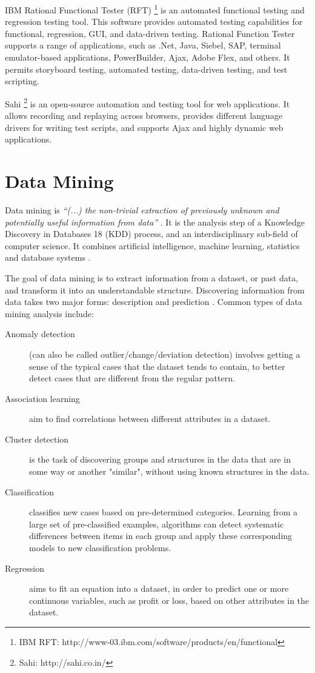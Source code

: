 IBM Rational Functional Tester (RFT) \footnote{IBM RFT: http://www-03.ibm.com/software/products/en/functional} is an automated functional testing and regression testing tool. This software provides automated testing capabilities for functional, regression, GUI, and data-driven testing. Rational Function Tester supports a range of applications, such as .Net, Java, Siebel, SAP, terminal emulator-based applications, PowerBuilder, Ajax, Adobe Flex, and others. It permits storyboard testing, automated testing, data-driven testing, and test scripting.

Sahi \footnote{Sahi: http://sahi.co.in/} is an open-source automation and testing tool for web applications. It allows recording and replaying across browsers, provides different language drivers for writing test scripts, and supports Ajax and highly dynamic web applications. 

\section{Data Mining}\label{sec:datamining}

Data mining is \textit{“(...) the non-trivial extraction of previously unknown and potentially useful information from data”} \cite{fayyad1996data}. It is the analysis step of a Knowledge Discovery in Databases 18 (KDD) process, and an interdisciplinary sub-field of computer science. It combines artificial intelligence, machine learning, statistics and database systems \cite{chakrabarti2004data}.

The goal of data mining is to extract information from a dataset, or past data, and transform it into an understandable structure. Discovering information from data takes two major forms: description and prediction \cite{maimon2005data}. Common types of data mining analysis include:
\begin{description}
	\item[Anomaly detection] (can also be called outlier/change/deviation detection) involves getting a sense of the typical cases that the dataset tends to contain, to better detect cases that are different from the regular pattern.
	\item[Association learning] aim to find correlations between different attributes in a dataset.
	\item[Cluster detection] is the task of discovering groups and structures in the data that are in some way or another "similar", without using known structures in the data.
	\item[Classification] classifies new cases based on pre-determined categories. Learning from a large set of pre-classified examples, algorithms can detect systematic differences between items in each group and apply these corresponding models to new classification problems.
	\item[Regression] aims to fit an equation into a dataset, in order to predict one or more continuous variables, such as profit or loss, based on other attributes in the dataset.
\end{description}

